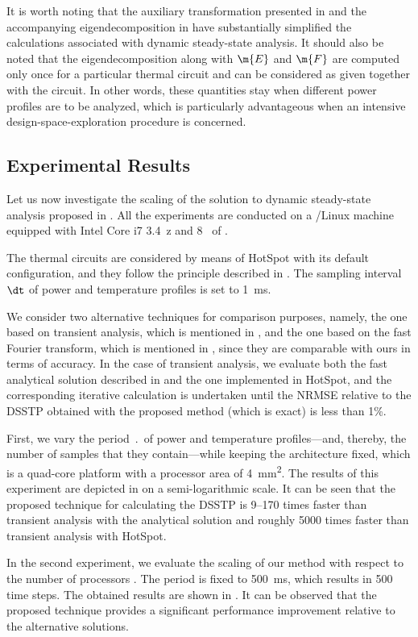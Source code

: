 It is worth noting that the auxiliary transformation presented in
 and the accompanying eigendecomposition in
 have substantially simplified the calculations
associated with dynamic steady-state analysis. It should also be noted that the
eigendecomposition along with $\m{E}$ and $\m{F}$ are computed only once for a
particular thermal  circuit and can be considered as given together with
the circuit. In other words, these quantities stay when different power profiles
are to be analyzed, which is particularly advantageous when an intensive
design-space-exploration procedure is concerned.

\subsection{Experimental Results}

Let us now investigate the scaling of the solution to dynamic steady-state
analysis proposed in . All the experiments
are conducted on a /Linux machine equipped with Intel Core i7
3.4~z and 8~ of .

The thermal  circuits are considered by means of HotSpot
\cite{skadron2003} with its default configuration, and they follow the principle
described in . The sampling interval $\dt$ of power and
temperature profiles is set to 1~ms.

We consider two alternative techniques for comparison purposes, namely, the one
based on transient analysis, which is mentioned in
, and the one based on the fast Fourier
transform, which is mentioned in , since
they are comparable with ours in terms of accuracy. In the case of transient
analysis, we evaluate both the fast analytical solution described in
 and the one implemented in HotSpot, and the
corresponding iterative calculation is undertaken until the \ac{NRMSE} relative
to the \ac{DSSTP} obtained with the proposed method (which is exact) is less
than 1\%.

First, we vary the period $\period$ of power and temperature profiles---and,
thereby, the number of samples \ns that they contain---while keeping the
architecture fixed, which is a quad-core platform with a processor area of
4~mm\textsuperscript{2}. The results of this experiment are depicted in
 on a semi-logarithmic scale. It can be seen that the
proposed technique for calculating the \ac{DSSTP} is 9--170 times faster than
transient analysis with the analytical solution and roughly 5000 times faster
than transient analysis with HotSpot.

In the second experiment, we evaluate the scaling of our method with respect to
the number of processors \np. The period is fixed to 500~ms, which results in
500 time steps. The obtained results are shown in . It
can be observed that the proposed technique provides a significant performance
improvement relative to the alternative solutions.
